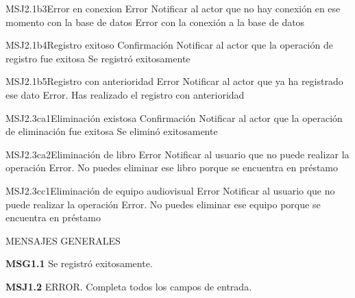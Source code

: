 	\begin{Message}{MSJ2.1b3}{Error en conexion}
		\MSGitem[Tipo:] Error	
		\MSGitem[Objetivo: ] Notificar al actor que no hay conexión en ese momento con la base de datos
		\MSGitem[Redacción: ] Error con la conexión a la base de datos
	\end{Message}
	
	\begin{Message}{MSJ2.1b4}{Registro exitoso}
		\MSGitem[Tipo:] Confirmación	
		\MSGitem[Objetivo: ] Notificar al actor que la operación de registro fue exitosa
		\MSGitem[Redacción: ] Se registró exitosamente
	\end{Message}
	
	\begin{Message}{MSJ2.1b5}{Registro con anterioridad}
		\MSGitem[Tipo:] Error	
		\MSGitem[Objetivo: ] Notificar al actor que ya ha registrado ese dato
		\MSGitem[Redacción: ] Error. Has realizado el registro con anterioridad
	\end{Message}
	
	\begin{Message}{MSJ2.3ca1}{Eliminación existosa}
		\MSGitem[Tipo:] Confirmación	
		\MSGitem[Objetivo: ] Notificar al actor que la operación de eliminación fue exitosa
		\MSGitem[Redacción: ] Se eliminó exitosamente
	\end{Message}
	
	\begin{Message}{MSJ2.3ca2}{Eliminación de libro}
		\MSGitem[Tipo:] Error	
		\MSGitem[Objetivo: ] Notificar al usuario que no puede realizar la operación
		\MSGitem[Redacción: ] Error. No puedes eliminar ese libro porque se encuentra en préstamo
	\end{Message}
	
	\begin{Message}{MSJ2.3cc1}{Eliminación de equipo audiovisual}
		\MSGitem[Tipo:] Error	
		\MSGitem[Objetivo: ] Notificar al usuario que no puede realizar la operación
		\MSGitem[Redacción: ] Error. No puedes eliminar ese equipo porque se encuentra en préstamo
	\end{Message}
	

MENSAJES GENERALES
	\begin{Citemize}
	\item {\bf MSG1.1} Se registró exitosamente.
	\end{Citemize}
	
	\begin{Citemize}
	\item {\bf MSJ1.2} ERROR. Completa todos los campos de entrada.
	\end{Citemize}
	
